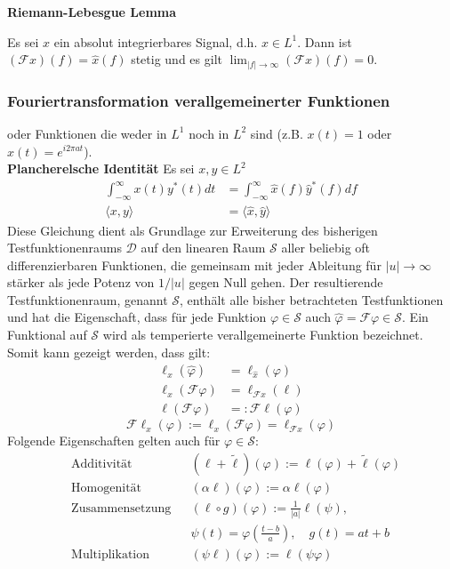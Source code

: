 \smallskip

\textbf{Riemann-Lebesgue Lemma}

Es sei $x$ ein absolut integrierbares Signal, d.h. $x \in L^1$. Dann ist $(\mathcal{F}x)(f)=\hat{x}(f)$ stetig und es gilt $\lim_{|f|\to\infty}(\mathcal{F}x)(f)=0$.

\subsubsection{Fouriertransformation verallgemeinerter Funktionen}
oder Funktionen die weder in $L^1$ noch in $L^2$ sind (z.B. $x(t)=1$ oder $x(t)=e^{i2\pi at}$).
\\
\textbf{Plancherelsche Identität}
Es sei $x,y \in L^2$
\begin{align*}
    \int_{-\infty}^\infty x(t)y^*(t)dt & =\int_{-\infty}^\infty\hat{x}(f)\hat{y}^*(f)df \\
    \langle x,y\rangle                 & = \langle\hat{x},\hat{y}\rangle
\end{align*}
Diese Gleichung dient als Grundlage zur Erweiterung des bisherigen Testfunktionenraums $\mathcal{D}$ auf den linearen Raum $\mathcal{S}$ aller beliebig oft differenzierbaren Funktionen, die gemeinsam mit jeder Ableitung für $|u| \rightarrow \infty$ stärker als jede Potenz von $1/|u|$ gegen Null gehen. Der resultierende Testfunktionenraum, genannt $\mathcal{S}$, enthält alle bisher betrachteten Testfunktionen und hat die Eigenschaft, dass für jede Funktion $\varphi \in \mathcal{S}$ auch $\hat{\varphi} = \mathcal{F}\varphi \in \mathcal{S}$. Ein Funktional auf $\mathcal{S}$ wird als temperierte verallgemeinerte Funktion bezeichnet.
Somit kann gezeigt werden, dass gilt:
\begin{align*}
    \ell_x(\hat{\varphi})      & =\ell_{\hat{x}}(\varphi)   \\
    \ell_x(\mathcal{F}\varphi) & =\ell_{\mathcal{F}x}(\ell) \\
    \ell(\mathcal{F}\varphi)   & =:\mathcal{F}\ell(\varphi)
\end{align*}
\begin{equation*}
    \mathcal{F}\ell_x(\varphi):=\ell_x(\mathcal{F}\varphi)=\ell_{\mathcal{F}x}(\varphi)
\end{equation*}
Folgende Eigenschaften gelten auch für $\varphi \in \mathcal{S}$:
\begin{align*}
     & \text{Additivität}     &  & (\ell+\widetilde{\ell})(\varphi):=\ell(\varphi)+\widetilde{\ell}(\varphi) \\
     & \text{Homogenität}     &  & (\alpha\ell)(\varphi):=\alpha\ell(\varphi)                                \\
     & \text{Zusammensetzung} &  & (\ell\circ g)(\varphi):=\frac{1}{|a|}\ell(\psi),                          \\
     &                        &  & \psi(t)=\varphi\!\left(\frac{t-b}{a}\right),\quad g(t)=at+b               \\
     & \text{Multiplikation}  &  & (\psi\ell)(\varphi):=\ell(\psi\varphi)
\end{align*}
